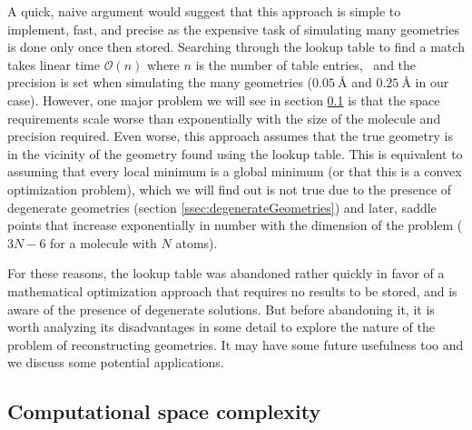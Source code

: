A quick, naive argument would suggest that this approach is simple to implement, fast, and precise as the expensive task of simulating many geometries is done only once then stored. Searching through the lookup table to find a match takes linear time $\mathcal{O}(n)$ where $n$ is the number of table entries,\footnotemark~ and the precision is set when simulating the many geometries ($\SI{0.05}{\angstrom}$ and $\SI{0.25}{\angstrom}$ in our case). However, one major problem we will see in section \ref{ssec:LTspace} is that the space requirements scale worse than exponentially with the size of the molecule and precision required. Even worse, this approach assumes that the true geometry is in the vicinity of the geometry found using the lookup table. This is equivalent to assuming that every local minimum is a global minimum (or that this is a convex optimization problem), which we will find out is not true due to the presence of degenerate geometries (section \ref{ssec:degenerateGeometries}) and later, saddle points that increase exponentially in number with the dimension of the problem ($3N-6$ for a molecule with $N$ atoms).


For these reasons, the lookup table was abandoned rather quickly in favor of a mathematical optimization approach that requires no results to be stored, and is aware of the presence of degenerate solutions. But before abandoning it, it is worth analyzing its disadvantages in some detail to explore the nature of the problem of reconstructing geometries. It may have some future usefulness too and we discuss some potential applications.

\subsection{Computational space complexity} \label{ssec:LTspace}

